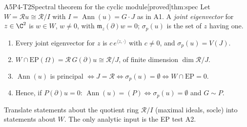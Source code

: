 \documentclass[11pt,a4paper,oneside]{report}
\newcommand{\badge}[2]{\textcolor{#1}{\textsf{\footnotesize[#2]}}}
\newcommand{\proved}{\badge{cC}{proved}}
\newcommand{\Ann}{\operatorname{Ann}}
\newcommand{\EP}{\mathrm{EP}}
\newcommand{\ring}{\mathcal{R}}
\newcommand{\Var}{V}
\DeclareMathOperator{\dimc}{dim}
\newenvironment{dimcard}[5]{\par\Needspace{12\baselineskip}\begin{dimcardbox}{#1}{#2}{#3}{#4}{#5}}{\end{dimcardbox}}
\begin{document}
\begin{dimcard}{A5}{P4-T2}{Spectral theorem for the cyclic module}{\proved}{thm:spec}
Let $W=\ring u\cong\ring/I$ with $I=\Ann(u)=G\cdot J$ as in A1. A \emph{joint eigenvector} for $z\in\C^2$ is $w\in W$, $w\ne0$, with $\mathfrak m_z(\partial)w=0$; $\sigma_p(u)$ is the set of $z$ having one.
\begin{enumerate}[label=(\roman*)]
\item Every joint eigenvector for $z$ is $c\,e^{\langle z,\cdot\rangle}$ with $c\ne0$, and $\sigma_p(u)=\Var(J)$.
\item $W\cap\EP(\Omega)=\ring\,G(\partial)u\cong\ring/J$, of finite dimension $\dimc\ring/J$.
\item $\Ann(u)$ is principal $\iff J=\ring\iff\sigma_p(u)=\emptyset\iff W\cap\EP=0$.
\item Hence, if $P(\partial)u=0$: $\Ann(u)=(P)\iff\sigma_p(u)=\emptyset$ and $G\sim P$.
\end{enumerate}
\end{dimcard}

\begin{proofidea}
Translate statements about the quotient ring $\ring/I$ (maximal ideals, socle) into statements about $W$. The only analytic input is the EP test A2.
\end{proofidea}
\end{document}
